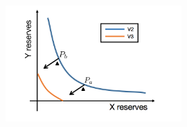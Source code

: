 \documentclass[a4paper,12pt]{article}%
\begin{document}
 




\begin{figure}[!ht]
    \centering
    \includegraphics[width=0.6\textwidth]{krivulja.png}
\end{figure}






\end{document}
